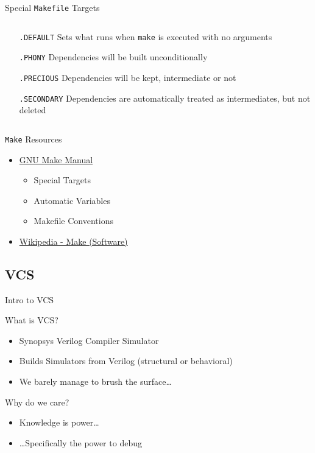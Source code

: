 \documentclass[dvipsnames]{beamer}
\begin{document}
\begin{frame}{Special \texttt{Makefile} Targets}
	\begin{columns}
		\begin{column}[c]{0.75\textwidth}
			\begin{itemize}
				\item[\texttt{.DEFAULT}] Sets what runs when \texttt{make} is executed
					with no arguments 
				\item[\texttt{.PHONY}] Dependencies will be built
					unconditionally 
				\item[\texttt{.PRECIOUS}] Dependencies will be kept,
					intermediate or not
				\item[\texttt{.SECONDARY}] Dependencies are automatically
					treated as intermediates, but not deleted
			\end{itemize}
		\end{column}
	\end{columns}
\end{frame}

\begin{frame}{\texttt{Make} Resources}
	\begin{itemize}
		\item \href{http://www.gnu.org/software/make/manual/make.pdf}{GNU Make Manual}
			\begin{itemize}
				\item Special Targets
				\item Automatic Variables
				\item Makefile Conventions 
			\end{itemize}
		\item \href{http://en.wikipedia.org/wiki/Make_(software)}{Wikipedia - Make (Software)}
	\end{itemize}	
\end{frame}

\subsection{VCS}
\begin{frame}{Intro to VCS}
	\begin{block}{What is VCS?}
		\begin{itemize}
			\item Synopsys Verilog Compiler Simulator
			\item Builds Simulators from Verilog (structural or behavioral)
			\item We barely manage to brush the surface\dots
		\end{itemize}
	\end{block}
	\begin{block}{Why do we care?}
		\begin{itemize}
			\item Knowledge is power\dots
			\item \dots Specifically the power to debug
		\end{itemize}
	\end{block}
\end{frame}
\end{document}
